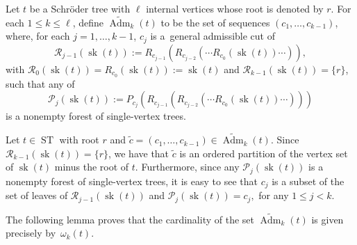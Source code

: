 \documentclass[11pt]{article}
\numberwithin{equation}{section}
\numberwithin{equation}{section}
\newcommand{\ST}{\operatorname{ST}}
\newcommand{\cR}{\mathcal{R}}
\newcommand{\ccP}{\mathcal{P}}
\newcommand{\sk}{\operatorname{sk}}
\newcommand{\AdmT}{\widetilde{\operatorname{Adm}}}
\begin{document}
Let $t$ be a Schr\"oder tree with $\ell$ internal vertices whose root is denoted by $r$. For each $1\leq k\leq \ell$, define $\AdmT_k(t)$ to be the set of sequences $(c_1,\dots,c_{k-1})$, where, for each $j=1,\dots,k-1$, $c_j$ is a~general admissible cut of
\[
	\cR_{j-1}(\sk(t)) := R_{c_{j-1}}(R_{c_{j-2}}(\cdots R_{c_0}(\sk(t))\cdots)),
\]
with $\cR_0(\sk(t))=R_{c_0}(\sk(t)) := \sk(t)$ and $\cR_{k-1}(\sk(t)) =\{r\}$, such that any of
\[
	\ccP_{j}(\sk(t)):=P_{c_j}(R_{c_{j-1}}(R_{c_{j-2}}(\cdots R_{c_0}(\sk(t))\cdots)))
\]
is a nonempty forest of single-vertex trees.

\begin{Remark}Let $t\in \ST$ with root $r$ and $\tilde{c}= (c_1,\dots,c_{k-1})\!\in\! \AdmT_k(t)$. Since \mbox{$\cR_{k-1}(\sk(t)) = \{r\}$}, we have that $\tilde{c}$ is an ordered partition of the vertex set of $\sk(t)$ minus the root of $t$. Furthermore, since any $\ccP_j(\sk(t))$ is a nonempty forest of single-vertex trees, it is easy to see that $c_j$ is a subset of the set of leaves of $\cR_{j-1}(\sk(t))$ and $ \ccP_j(\sk(t)) = c_j,$ for any $1\leq j <k$.
\end{Remark}

The following lemma proves that the cardinality of the set $\AdmT_k(t)$ is given precisely by~$\omega_k(t)$.
\end{document}
